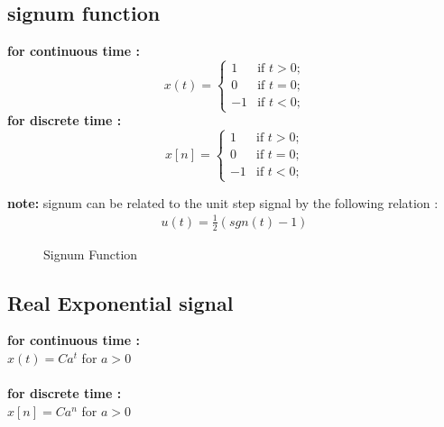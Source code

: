 \documentclass[a4paper,12pt]{book}
\begin{document}
\subsection*{ signum function}
{\bf for continuous time :}\\
	\[ x(t) = \left\{ \begin{array}{ll}

	1 & \mbox{if $t > 0$;} \\

	0 & \mbox{if $t = 0$;} \\
	-1 & \mbox{if $t < 0$;}
	\end{array}
	\right. \]
\bigskip
{\bf for discrete time :}\\
	\[ x[n] = \left\{ \begin{array}{ll}

	1 & \mbox{if $t > 0$;} \\

	0 & \mbox{if $t = 0$;} \\
	-1 & \mbox{if $t < 0$;}

	\end{array}
	\right. \]

{\bf note:} signum can be related to the unit step signal by the following relation :
\begin{align*}
u(t) = \frac{1}{2}(sgn(t)-1)
\end{align*}

\begin{figure}[h]  
\centering 
{}\hspace{6mm}
\caption{Signum Function} \label{fig:M}  
\end{figure}

\subsection*{ Real Exponential signal}
{\bf for continuous time :}\smallskip\\
	 $x(t) = Ca^t$ \hspace{4mm} for $a>0$\\
\bigskip\\
{\bf for discrete time :}\smallskip\\
	$x[n] = Ca^n$\hspace{4mm} for $a>0$\\
\end{document}
